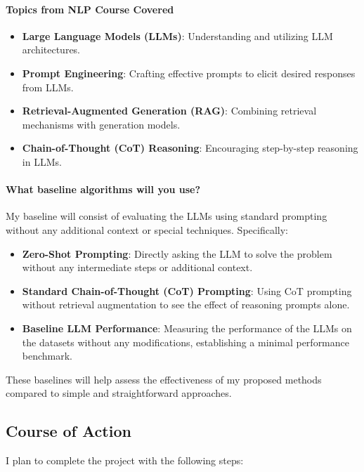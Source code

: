 \documentclass[11pt,a4paper]{article}
\begin{document}
\paragraph{Topics from NLP Course Covered}
\begin{itemize}
    \item \textbf{Large Language Models (LLMs)}: Understanding and utilizing LLM architectures.
    \item \textbf{Prompt Engineering}: Crafting effective prompts to elicit desired responses from LLMs.
    \item \textbf{Retrieval-Augmented Generation (RAG)}: Combining retrieval mechanisms with generation models.
    \item \textbf{Chain-of-Thought (CoT) Reasoning}: Encouraging step-by-step reasoning in LLMs.
\end{itemize}

\paragraph{What baseline algorithms will you use?}
My baseline will consist of evaluating the LLMs using standard prompting without any additional context or special techniques. Specifically:

\begin{itemize}
    \item \textbf{Zero-Shot Prompting}: Directly asking the LLM to solve the problem without any intermediate steps or additional context.
    \item \textbf{Standard Chain-of-Thought (CoT) Prompting}: Using CoT prompting without retrieval augmentation to see the effect of reasoning prompts alone.
    \item \textbf{Baseline LLM Performance}: Measuring the performance of the LLMs on the datasets without any modifications, establishing a minimal performance benchmark.
\end{itemize}

These baselines will help assess the effectiveness of my proposed methods compared to simple and straightforward approaches.

\subsection{Course of Action}
I plan to complete the project with the following steps:
\end{document}
